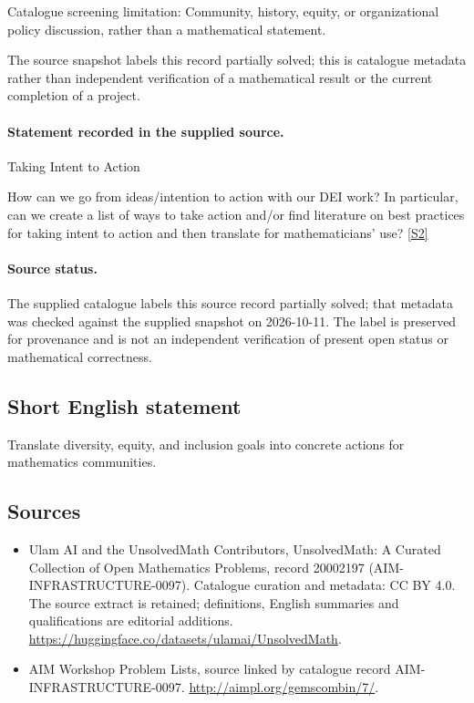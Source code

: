 \documentclass[11pt]{article}
\begin{document}
Catalogue screening limitation: Community, history, equity, or organizational policy discussion, rather than a mathematical statement.

The source snapshot labels this record partially solved; this is catalogue metadata rather than independent verification of a mathematical result or the current completion of a project.
\paragraph{Statement recorded in the supplied source.}
Taking Intent to Action

How can we go from ideas/intention to action with our DEI work? In particular, can we create a list of ways to take action and/or find literature on best practices for taking intent to action and then translate for mathematicians' use? \href{http://aimpl.org/gemscombin/7/}{[S2]}
\paragraph{Source status.}
The supplied catalogue labels this source record partially solved; that metadata was checked against the supplied snapshot on 2026-10-11. The label is preserved for provenance and is not an independent verification of present open status or mathematical correctness.
\subsection{Short English statement}
Translate diversity, equity, and inclusion goals into concrete actions for mathematics communities.
\subsection{Sources}
\begin{itemize}
\item[S1] Ulam AI and the UnsolvedMath Contributors, UnsolvedMath: A Curated Collection of Open Mathematics Problems, record 20002197 (AIM-INFRASTRUCTURE-0097). Catalogue curation and metadata: CC BY 4.0. The source extract is retained; definitions, English summaries and qualifications are editorial additions.
\url{https://huggingface.co/datasets/ulamai/UnsolvedMath}.
\item[S2] AIM Workshop Problem Lists, source linked by catalogue record AIM-INFRASTRUCTURE-0097.
\url{http://aimpl.org/gemscombin/7/}.
\end{itemize}
\end{document}
